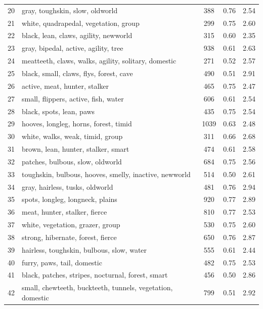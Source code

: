 \begin{table}[H]
\begin{tabular}{clccc}
        20 & gray, toughskin, slow, oldworld & 388 & 0.76 & 2.54 \\
        21 & white, quadrapedal, vegetation, group & 299 & 0.75 & 2.60 \\
        22 & black, lean, claws, agility, newworld & 315 & 0.60 & 2.35 \\
        23 & gray, bipedal, active, agility, tree & 938 & 0.61 & 2.63 \\
        24 & meatteeth, claws, walks, agility, solitary, domestic & 271 & 0.52 & 2.57 \\
        25 & black, small, claws, flys, forest, cave & 490 & 0.51 & 2.91 \\
        26 & active, meat, hunter, stalker & 465 & 0.75 & 2.47 \\
        27 & small, flippers, active, fish, water & 606 & 0.61 & 2.54 \\
        28 & black, spots, lean, paws & 435 & 0.75 & 2.54 \\
        29 & hooves, longleg, horns, forest, timid & 1039 & 0.63 & 2.48 \\
        30 & white, walks, weak, timid, group & 311 & 0.66 & 2.68 \\
        31 & brown, lean, hunter, stalker, smart & 474 & 0.61 & 2.58 \\
        32 & patches, bulbous, slow, oldworld & 684 & 0.75 & 2.56 \\
        33 & toughskin, bulbous, hooves, smelly, inactive, newworld & 514 & 0.50 & 2.61 \\
        34 & gray, hairless, tusks, oldworld & 481 & 0.76 & 2.94 \\
        35 & spots, longleg, longneck, plains & 920 & 0.77 & 2.89 \\
        36 & meat, hunter, stalker, fierce & 810 & 0.77 & 2.53 \\
        37 & white, vegetation, grazer, group & 530 & 0.75 & 2.60 \\
        38 & strong, hibernate, forest, fierce & 650 & 0.76 & 2.87 \\
        39 & hairless, toughskin, bulbous, slow, water & 555 & 0.61 & 2.44 \\
        40 & furry, paws, tail, domestic & 482 & 0.75 & 2.53 \\
        41 & black, patches, stripes, nocturnal, forest, smart & 456 & 0.50 & 2.86 \\
        42 & small, chewteeth, buckteeth, tunnels, vegetation, domestic & 799 & 0.51 & 2.92 \\

\end{tabular}
\end{table}
